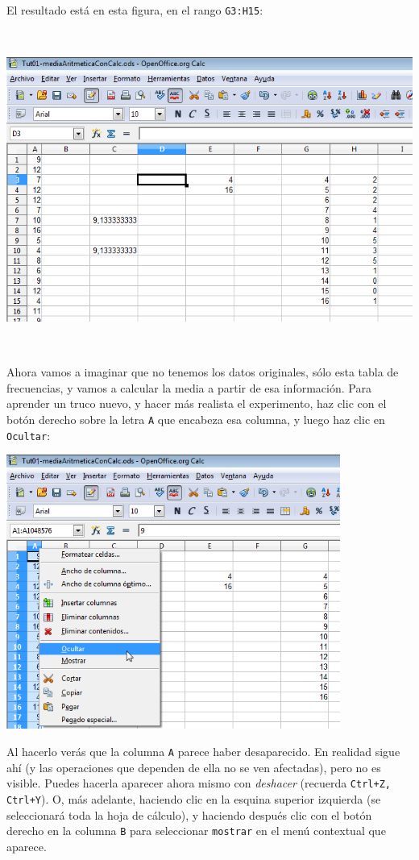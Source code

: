 \documentclass[10pt,a4paper]{article}\usepackage[]{graphicx}\usepackage[]{color}
\newcounter {cont01}
\begin{document}
El resultado está en esta figura, en el rango {\tt G3:H15}:
    \begin{center}
    \includegraphics[height=10.5cm]{../fig/Tut01-Calc-Formula-19.png}
    \end{center}
Ahora vamos a imaginar que no tenemos los datos originales, sólo esta tabla de frecuencias, y vamos a calcular la media a partir de esa información. Para aprender un truco nuevo, y hacer más realista el experimento, haz clic con el botón derecho sobre la letra {\tt A} que encabeza esa columna, y luego haz clic en {\tt Ocultar}:
    \begin{center}
    \includegraphics[height=9cm]{../fig/Tut01-Calc-Formula-20.png}
    \end{center}
Al hacerlo verás que la columna {\tt A} parece haber desaparecido. En realidad sigue ahí (y las operaciones que dependen de ella no se ven afectadas), pero no es visible. Puedes hacerla aparecer ahora mismo con {\em deshacer} (recuerda {\tt Ctrl+Z, Ctrl+Y}). O, más adelante, haciendo clic en la esquina superior izquierda (se seleccionará toda la hoja de cálculo), y haciendo después clic con el botón derecho en la columna {\tt B} para seleccionar {\tt mostrar} en el menú contextual que aparece.
\end{document}
